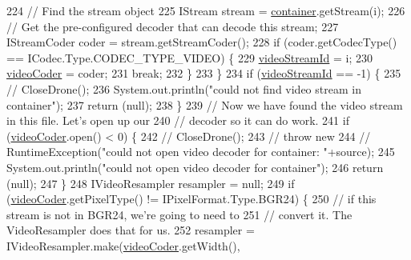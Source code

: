 \begin{DoxyCode}
224             \textcolor{comment}{// Find the stream object}
225             IStream stream = \hyperlink{classworkspace_1_1_a_r_drone_capture_image_1_1src_1_1_drone_tools_a1c1b1c9966fa3b80bb679d60c9b93c4d}{container}.getStream(i);
226             \textcolor{comment}{// Get the pre-configured decoder that can decode this stream;}
227             IStreamCoder coder = stream.getStreamCoder();
228             \textcolor{keywordflow}{if} (coder.getCodecType() == ICodec.Type.CODEC\_TYPE\_VIDEO) \{
229                 \hyperlink{classworkspace_1_1_a_r_drone_capture_image_1_1src_1_1_drone_tools_a26096ea27f8535f3e07d0fd78c73933f}{videoStreamId} = i;
230                 \hyperlink{classworkspace_1_1_a_r_drone_capture_image_1_1src_1_1_drone_tools_ade856f1d7f4cc80de7a3f76b847c5c40}{videoCoder} = coder;
231                 \textcolor{keywordflow}{break};
232             \}
233         \}
234         \textcolor{keywordflow}{if} (\hyperlink{classworkspace_1_1_a_r_drone_capture_image_1_1src_1_1_drone_tools_a26096ea27f8535f3e07d0fd78c73933f}{videoStreamId} == -1) \{
235             \textcolor{comment}{// CloseDrone();}
236             System.out.println(\textcolor{stringliteral}{"could not find video stream in container"});
237             \textcolor{keywordflow}{return} (null);
238         \}
239         \textcolor{comment}{// Now we have found the video stream in this file. Let's open up our}
240         \textcolor{comment}{// decoder so it can do work.}
241         \textcolor{keywordflow}{if} (\hyperlink{classworkspace_1_1_a_r_drone_capture_image_1_1src_1_1_drone_tools_ade856f1d7f4cc80de7a3f76b847c5c40}{videoCoder}.open() < 0) \{
242             \textcolor{comment}{// CloseDrone();}
243             \textcolor{comment}{// throw new}
244             \textcolor{comment}{// RuntimeException("could not open video decoder for container: "+source);}
245             System.out.println(\textcolor{stringliteral}{"could not open video decoder for container"});
246             \textcolor{keywordflow}{return} (null);
247         \}
248         IVideoResampler resampler = null;
249         \textcolor{keywordflow}{if} (\hyperlink{classworkspace_1_1_a_r_drone_capture_image_1_1src_1_1_drone_tools_ade856f1d7f4cc80de7a3f76b847c5c40}{videoCoder}.getPixelType() != IPixelFormat.Type.BGR24) \{
250             \textcolor{comment}{// if this stream is not in BGR24, we're going to need to}
251             \textcolor{comment}{// convert it. The VideoResampler does that for us.}
252             resampler = IVideoResampler.make(\hyperlink{classworkspace_1_1_a_r_drone_capture_image_1_1src_1_1_drone_tools_ade856f1d7f4cc80de7a3f76b847c5c40}{videoCoder}.getWidth(),

\end{DoxyCode}
